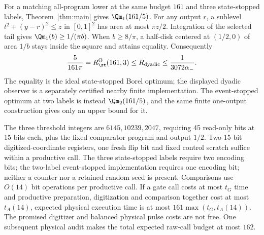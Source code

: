 For a matching all-program lower at the same budget $161$ and three state-stopped labels, Theorem~\ref{thm:main} gives $\Qm_1(161/5)$. For any output $r$, a sublevel $t^2+(y-r)^2\le z$ in $[0,1]^2$ has area at most $\pi z/2$. Integration of the selected tail gives $\Qm_1(b)\ge1/(\pi b)$. When $b\ge8/\pi$, a half-disk centered at $(1/2,0)$ of area $1/b$ stays inside the square and attains equality. Consequently
\begin{equation}\label{eq:dyadic-interval}
 \frac5{161\pi}=R_\st^\Theta(161,3)
 \le R_{\rm dyadic}\le\frac1{3072\alpha_-}.
\end{equation}
The equality is the ideal state-stopped Borel optimum; the displayed dyadic observer is a separately certified nearby finite implementation. The event-stopped optimum at two labels is instead $\Qm_2(161/5)$, and the same finite one-output construction gives only an upper bound for it.

The three threshold integers are $6145,10239,2047$, requiring 45 read-only bits at 15 bits each, plus the fixed comparator program and output $1/2$. Two 15-bit digitized-coordinate registers, one fresh flip bit and fixed control scratch suffice within a productive call. The three state-stopped labels require two encoding bits; the two-label event-stopped implementation requires one encoding bit; neither a counter nor a retained random seed is present. Comparisons use $O(14)$ bit operations per productive call. If a gate call costs at most $t_G$ time and productive preparation, digitization and comparison together cost at most $t_A(14)$, expected physical execution time is at most $161\max(t_G,t_A(14))$. The promised digitizer and balanced physical pulse costs are not free. One subsequent physical audit makes the total expected raw-call budget at most $162$.
